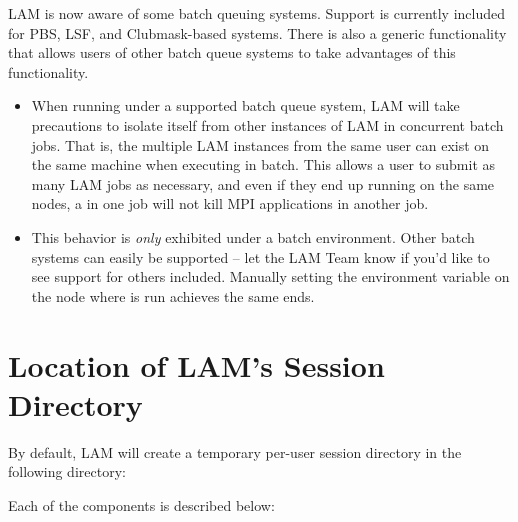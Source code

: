 LAM is now aware of some batch queuing systems.  Support is currently
included for PBS, LSF, and Clubmask-based
systems.  There is also a generic functionality that allows users of
other batch queue systems to take advantages of this functionality.

\begin{itemize}
\item When running under a supported batch queue system, LAM will take
  precautions to isolate itself from other instances of LAM in
  concurrent batch jobs.  That is, the multiple LAM instances from the
  same user can exist on the same machine when executing in batch.
  This allows a user to submit as many LAM jobs as necessary, and even
  if they end up running on the same nodes, a  in one
  job will not kill MPI applications in another job.
  
\item This behavior is {\em only} exhibited under a batch environment.
  Other batch systems can easily be supported -- let the LAM Team know
  if you'd like to see support for others included.  Manually setting
  the environment variable 
  on the node where  is run achieves the same ends.
 \end{itemize}


\section{Location of LAM's Session Directory}
\label{sec:misc-session-directory}

By default, LAM will create a temporary per-user session directory
in the following directory:

\centerline{}

\noindent Each of the components is described below:

